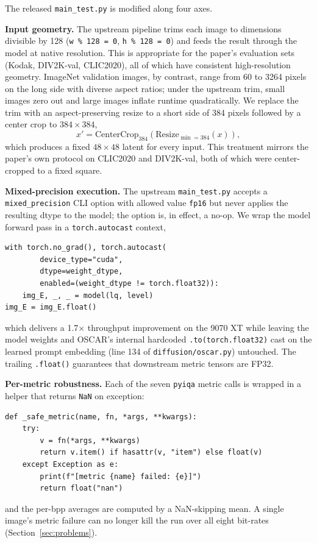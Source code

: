 \documentclass[conference]{IEEEtran}
\begin{document}
The released \texttt{main\_test.py} is modified along four axes.

\textbf{Input geometry.}
The upstream pipeline trims each image to dimensions divisible by 128
(\texttt{w \% 128 = 0}, \texttt{h \% 128 = 0}) and feeds the result through the
model at native resolution. This is appropriate for the paper's evaluation sets
(Kodak, DIV2K-val, CLIC2020), all of which have consistent high-resolution
geometry. ImageNet validation images, by contrast, range from 60 to 3264 pixels
on the long side with diverse aspect ratios; under the upstream trim, small
images zero out and large images inflate runtime quadratically. We replace the
trim with an aspect-preserving resize to a short side of 384 pixels followed by
a center crop to $384 \times 384$,
\begin{equation*}
x' = \text{CenterCrop}_{384}\!\left(\text{Resize}_{\min=384}(x)\right),
\end{equation*}
which produces a fixed $48 \times 48$ latent for every input. This treatment
mirrors the paper's own protocol on CLIC2020 and DIV2K-val, both of which were
center-cropped to a fixed square.

\textbf{Mixed-precision execution.}
The upstream \texttt{main\_test.py} accepts a \texttt{mixed\_precision} CLI
option with allowed value \texttt{fp16} but never applies the resulting dtype
to the model; the option is, in effect, a no-op. We wrap the model forward
pass in a \texttt{torch.autocast} context,
\begin{verbatim}
with torch.no_grad(), torch.autocast(
        device_type="cuda",
        dtype=weight_dtype,
        enabled=(weight_dtype != torch.float32)):
    img_E, _, _ = model(lq, level)
img_E = img_E.float()
\end{verbatim}
which delivers a 1.7$\times$ throughput improvement on the 9070 XT while
leaving the model weights and OSCAR's internal hardcoded
\texttt{.to(torch.float32)} cast on the learned prompt embedding
(line 134 of \texttt{diffusion/oscar.py}) untouched. The trailing
\texttt{.float()} guarantees that downstream metric tensors are FP32.

\textbf{Per-metric robustness.}
Each of the seven \texttt{pyiqa} metric calls is wrapped in a helper that
returns \texttt{NaN} on exception:
\begin{verbatim}
def _safe_metric(name, fn, *args, **kwargs):
    try:
        v = fn(*args, **kwargs)
        return v.item() if hasattr(v, "item") else float(v)
    except Exception as e:
        print(f"[metric {name} failed: {e}]")
        return float("nan")
\end{verbatim}
and the per-bpp averages are computed by a NaN-skipping mean. A single image's
metric failure can no longer kill the run over all eight bit-rates
(Section~\ref{sec:problems}).
\end{document}
